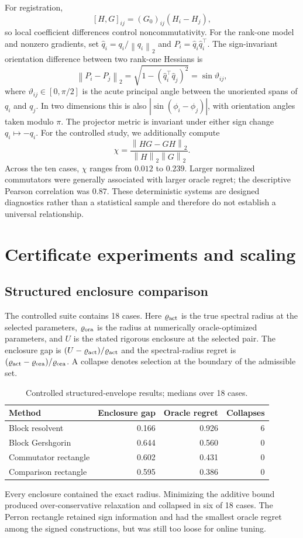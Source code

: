 \documentclass[11pt]{article}
\newcommand{\norm}[1]{\left\lVert #1\right\rVert}
\newcommand{\spr}{\varrho}
\begin{document}
For registration,
\[
[H,G]_{ij}=(G_0)_{ij}(H_i-H_j),
\]
so local coefficient differences control noncommutativity. For the rank-one
model and nonzero gradients, set
$\widehat q_i=q_i/\norm{q_i}_2$ and
$P_i=\widehat q_i\widehat q_i^\top$. The sign-invariant orientation difference
between two rank-one Hessians is
\[
\norm{P_i-P_j}_2
=\sqrt{1-(\widehat q_i^\top\widehat q_j)^2}
=\sin\vartheta_{ij},
\]
where $\vartheta_{ij}\in[0,\pi/2]$ is the acute principal angle between the
unoriented spans of $q_i$ and $q_j$. In two dimensions this is also
$|\sin(\phi_i-\phi_j)|$, with orientation angles taken modulo $\pi$. The
projector metric is invariant under either sign change $q_i\mapsto-q_i$. For
the controlled study, we additionally compute
\[
\chi=\frac{\norm{HG-GH}_2}{\norm H_2\norm G_2}.
\]
Across the ten cases, $\chi$ ranges from $0.012$ to $0.239$. Larger
normalized commutators were generally associated with larger oracle regret;
the descriptive Pearson correlation was $0.87$. These deterministic systems
are designed diagnostics rather than a statistical sample and therefore do not
establish a universal relationship.

\section{Certificate experiments and scaling}\label{sec:certificate_results}
\subsection{Structured enclosure comparison}
The controlled suite contains 18 cases. Here $\spr_{\rm act}$ is the true
spectral radius at the selected parameters, $\spr_{\rm ora}$ is the radius at
numerically oracle-optimized parameters, and $U$ is the stated rigorous
enclosure at the selected pair. The enclosure gap is
$(U-\spr_{\rm act})/\spr_{\rm act}$ and the spectral-radius regret is
$(\spr_{\rm act}-\spr_{\rm ora})/\spr_{\rm ora}$. A collapse denotes selection
at the boundary of the admissible set.
\begin{table}[H]
\centering
\caption{Controlled structured-envelope results; medians over 18 cases.}
\begin{tabular}{lrrr}
\toprule
Method & Enclosure gap & Oracle regret & Collapses\\
\midrule
Block resolvent & 0.166 & 0.926 & 6\\
Block Gershgorin & 0.644 & 0.560 & 0\\
Commutator rectangle & 0.602 & 0.431 & 0\\
Comparison rectangle & 0.595 & 0.386 & 0\\
\bottomrule
\end{tabular}
\end{table}
Every enclosure contained the exact radius. Minimizing the additive bound
produced over-conservative relaxation and collapsed in six of 18 cases. The
Perron rectangle retained sign information and had the smallest oracle regret
among the signed constructions, but was still too loose for online tuning.
\end{document}
